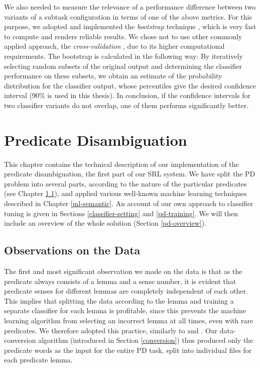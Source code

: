 \documentclass[12pt,notitlepage]{report}
\begin{document}
We also needed to measure the relevance of a performance difference between two variants of a subtask configuration in terms of one of the above metrics. For this purpose, we adopted and implemented the \emph{bootstrap} technique \citep[p. 152]{efron79,witten05}, which is very fast to compute and renders reliable results. We chose not to use other commonly applied approach, the \emph{cross-validation} \citep[p. 241ff.]{hastie09}, due to its higher computational requirements.
The bootstrap is calculated in the following way: By iteratively selecting random subsets of the original output and determining the classifier performance on these subsets, we obtain an estimate of the probability distribution for the classifier output, whose percentiles give the desired confidence interval (90\% is used in this thesis). In conclusion, if the confidence intervals for two classifier variants do not overlap, one of them performs significantly better.

%
% 
\chapter{Predicate Disambiguation}\label{pd}
%
%

This chapter contains the technical description of our implementation of the predicate disambiguation, the first part of our SRL system. We have split the PD problem into several parts, according to the nature of the particular predicates (see Chapter \ref{pd-observe}), and applied various well-known machine learning techniques described in Chapter \ref{ml-semantic}. An account of our own approach to classifier tuning is given in Sections \ref{classifier-setting} and \ref{pd-training}. We will then include an overview of the whole solution (Section \ref{pd-overview}).

\section{Observations on the Data}\label{pd-observe}

The first and most significant observation we made on the data is that as the predicate always consists of a lemma and a sense number, it is evident that predicate senses for different lemmas are completely independent of each other. This implies that splitting the data according to the lemma and training a separate classifier for each lemma is profitable, since this prevents the machine learning algorithm from selecting an incorrect lemma at all times, even with rare predicates. We therefore adopted this practice, similarly to \citet{che09} and \citet{nugues09}. Our data-conversion algorithm (introduced in Section \ref{conversion}) thus produced only the predicate words as the input for the entire PD task, split into individual files for each predicate lemma. 
\end{document}
